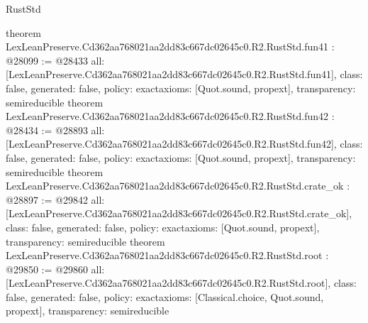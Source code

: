 \begin{lexlean}{RustStd}
\begin{coremodule}
{}
theorem LexLeanPreserve.Cd362aa768021aa2dd83c667dc02645c0.R2.RustStd.fun41 : @28099 := @28433 {
  all: [LexLeanPreserve.Cd362aa768021aa2dd83c667dc02645c0.R2.RustStd.fun41],
  class: false,
  generated: false,
  policy: exact{axioms: [Quot.sound, propext]},
  transparency: semireducible
}
theorem LexLeanPreserve.Cd362aa768021aa2dd83c667dc02645c0.R2.RustStd.fun42 : @28434 := @28893 {
  all: [LexLeanPreserve.Cd362aa768021aa2dd83c667dc02645c0.R2.RustStd.fun42],
  class: false,
  generated: false,
  policy: exact{axioms: [Quot.sound, propext]},
  transparency: semireducible
}
theorem LexLeanPreserve.Cd362aa768021aa2dd83c667dc02645c0.R2.RustStd.crate_ok : @28897 := @29842 {
  all: [LexLeanPreserve.Cd362aa768021aa2dd83c667dc02645c0.R2.RustStd.crate_ok],
  class: false,
  generated: false,
  policy: exact{axioms: [Quot.sound, propext]},
  transparency: semireducible
}
theorem LexLeanPreserve.Cd362aa768021aa2dd83c667dc02645c0.R2.RustStd.root : @29850 := @29860 {
  all: [LexLeanPreserve.Cd362aa768021aa2dd83c667dc02645c0.R2.RustStd.root],
  class: false,
  generated: false,
  policy: exact{axioms: [Classical.choice, Quot.sound, propext]},
  transparency: semireducible
}


\end{coremodule}
\end{lexlean}
